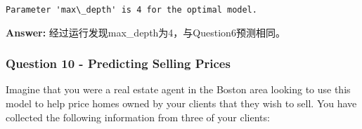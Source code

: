 \documentclass{article}
\begin{document}
    \begin{Verbatim}[commandchars=\\\{\}]
Parameter 'max\_depth' is 4 for the optimal model.
    \end{Verbatim}

    \textbf{Answer: } 经过运行发现max\_depth为4，与Question6预测相同。

    \subsubsection{Question 10 - Predicting Selling
Prices}\label{question-10---predicting-selling-prices}

Imagine that you were a real estate agent in the Boston area looking to
use this model to help price homes owned by your clients that they wish
to sell. You have collected the following information from three of your
clients:
\end{document}
